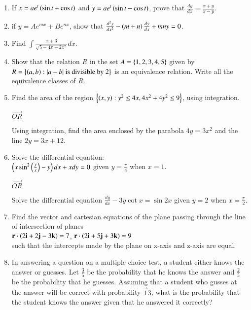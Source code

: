 \documentclass[journal,12pt,twocolumn]{IEEEtran}
\theoremstyle{remark}
\begin{document}
\begin{enumerate}
\item If $x = ae^t\left(\sin{t}+\cos{t}\right)$ and $y = ae^t\left(\sin{t}-\cos{t}\right)$, prove that $\frac{dy}{dx}=\frac{x+y}{x-y}$. \\
\item if $y = Ae^{mx} + Be^{nx}$, show that $\frac{d^{2}y}{dx^2} -\left(m+n\right)\frac{dy}{dx} + mny = 0$. \\
\item Find $\int \frac{x+3}{\sqrt{5-4x-2x^2}}dx$.\\
\item Show that the relation $R$ in the set $A = \left\{1,2,3,4,5\right\}$ given by $R = \left\{\left(a,b\right) : |a-b| \text{ is divisible by 2}\right\}$ is an equivalence relation. Write all the equivalence classes of $R$. \\ 
\item Find the area of the region $\left\{\left(x,y\right) : y^2 \leq 4x, 4x^2+4y^2 \leq 9\right\}$, using integration.
\begin{center} $\vec{OR}$ \\ \end{center}
Using integration, find the area enclosed by the parabola $4y = 3x^2$ and the line $2y = 3x+12$. \\
\item Solve the differential equation: \\
$\left(x\sin^2{\left(\frac{y}{x}\right)}-y\right)dx +xdy = 0$ given $y = \frac{\pi}{4}$ when $x=1$.
\begin{center} $\vec{OR}$ \\ \end{center}
Solve the differential equation $\frac{dy}{dx}-3y\cot{x} = \sin{2x}$ given $y=2$ when $x=\frac{\pi}{2}$.\\
\item Find the vector and cartesian equations of the plane passing through the line of intersection of planes \\
$\mathbf{r}\cdot\left(2\mathbf{i}+2\mathbf{j}-3\mathbf{k}\right)=7$, $\mathbf{r}\cdot\left(2\mathbf{i}+5\mathbf{j}+3\mathbf{k}\right)=9$\\
such that the intercepts made by the plane on x-axis and z-axis are equal.\\
\item In answering a question on a multiple choice test, a student either knows the answer or guesses. Let $\frac{3}{5}$ be the probability that he knows the answer and $\frac{2}{5}$ be the probability that he guesses. Assuming that a student who gusses at the answer will be correct with probability $\vec{1}{3}$, what is the probability that the student knows the answer given that he answered it correctly?\\

\end{enumerate}
\end{document}
